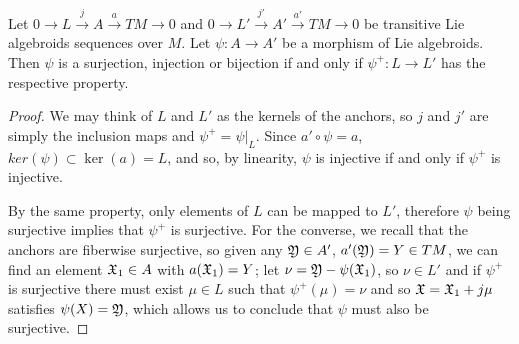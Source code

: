\begin{proposition}
Let $0 \to L \xrightarrow{j} A \xrightarrow{a} TM \to 0$ and $0 \to L' \xrightarrow{j'} A' \xrightarrow{a'} TM \to 0$ be transitive Lie algebroids sequences over $M$. Let $\psi: A \to A'$ be a morphism of Lie algebroids. Then $\psi$ is a surjection, injection or bijection if and only if $\psi^+: L \to L'$ has the respective property.
\end{proposition}

\begin{proof}
We may think of $L$ and $L'$ as the kernels of the anchors, so $j$ and $j'$ are simply the inclusion maps and $\psi^+ = \psi|_L$. Since $a' \circ \psi = a$, $ker(\psi) \subset \ker(a) = L$, and so, by linearity, $\psi$ is injective if and only if $\psi^+$ is injective.

By the same property, only elements of $L$ can be mapped to $L'$, therefore $\psi$ being surjective implies that $\psi^+$ is surjective. For the converse, we recall that the anchors are fiberwise surjective, so given any $\mathfrak{Y} \in A'$, $a'(\mathfrak{Y}) = Y \in TM$, we can find an element $\mathfrak{X}_1 \in A$ with $a(\mathfrak{X}_1) = Y$; let $\nu = \mathfrak{Y} - \psi(\mathfrak{X}_1)$, so $\nu \in L'$ and if $\psi^+$ is surjective there must exist $\mu \in L$ such that $\psi^+(\mu) = \nu$ and so $\mathfrak{X} = \mathfrak{X}_1 + j\mu$ satisfies $\psi(X) = \mathfrak{Y}$, which allows us to conclude that $\psi$ must also be surjective.
\end{proof}









